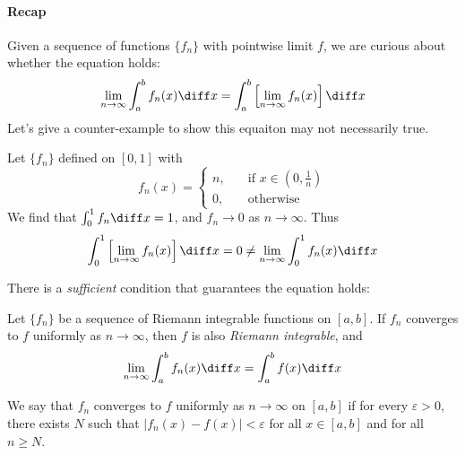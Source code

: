 \paragraph{Recap}
Given a sequence of functions $\{f_n\}$ with pointwise limit $f$, we are curious about whether the equation holds:
\[
\lim_{n\to\infty}\int_a^bf_n(x)\diff x
=
\int_a^b\left[\lim_{n\to\infty}f_n(x)\right]\diff x
\]
Let's give a counter-example to show this equaiton may not necessarily true.
\begin{example}
Let $\{f_n\}$ defined on $[0,1]$ with
\[
f_n(x)=\left\{
\begin{aligned}
n,&\quad\mbox{if $x\in(0,\frac{1}{n})$}\\
0,&\quad\mbox{otherwise}
\end{aligned}
\right.
\]
We find that $\int_0^1f_n\diff x=1$, and $f_n\to0$ as $n\to\infty$. Thus
\[
\int_0^1\left[\lim_{n\to\infty}f_n(x)\right]\diff x=0\ne
\lim_{n\to\infty}\int_0^1f_n(x)\diff x
\]
\end{example}
There is a \emph{sufficient} condition that guarantees the equation holds:
\begin{theorem}
Let $\{f_n\}$ be a sequence of Riemann integrable functions on $[a,b].$ If $f_n$ converges to $f$ uniformly as $n\to\infty$, then $f$ is also \emph{Riemann integrable}, and 
\[
\lim_{n\to\infty}\int_a^bf_n(x)\diff x
=
\int_a^bf(x)\diff x
\]
\end{theorem}
\begin{definition}
We say that $f_n$ converges to $f$ uniformly as $n\to\infty$ on $[a,b]$ if for every $\varepsilon>0$, there exists $N$ such that $|f_n(x) - f(x)|<\varepsilon$ for all $x\in[a,b]$ and for all $n\ge N$.
\end{definition}
